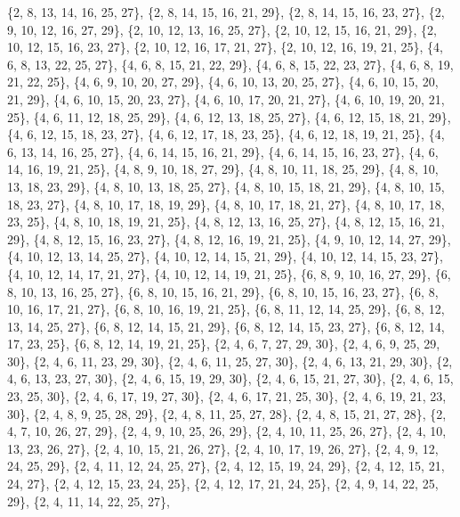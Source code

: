 \documentclass[11pt,a4paper]{article}
\begin{document}
{\{2, 8, 13, 14, 16, 25, 27\}, \{2, 8, 14, 15, 16, 21, 29\}, \{2, 8, 14, 15, 16, 23, 27\}, \{2, 9, 10, 12, 16, 27, 29\}, \{2, 10, 12, 13, 16, 25, 27\},
\{2, 10, 12, 15, 16, 21, 29\}, \{2, 10, 12, 15, 16, 23, 27\}, \{2, 10, 12, 16, 17, 21, 27\}, \{2, 10, 12, 16, 19, 21, 25\}, \{4, 6, 8, 13, 22, 25, 27\},
\{4, 6, 8, 15, 21, 22, 29\}, \{4, 6, 8, 15, 22, 23, 27\}, \{4, 6, 8, 19, 21, 22, 25\}, \{4, 6, 9, 10, 20, 27, 29\}, \{4, 6, 10, 13, 20, 25, 27\},
\{4, 6, 10, 15, 20, 21, 29\}, \{4, 6, 10, 15, 20, 23, 27\}, \{4, 6, 10, 17, 20, 21, 27\}, \{4, 6, 10, 19, 20, 21, 25\}, \{4, 6, 11, 12, 18, 25, 29\},
\{4, 6, 12, 13, 18, 25, 27\}, \{4, 6, 12, 15, 18, 21, 29\}, \{4, 6, 12, 15, 18, 23, 27\}, \{4, 6, 12, 17, 18, 23, 25\}, \{4, 6, 12, 18, 19, 21, 25\},
\{4, 6, 13, 14, 16, 25, 27\}, \{4, 6, 14, 15, 16, 21, 29\}, \{4, 6, 14, 15, 16, 23, 27\}, \{4, 6, 14, 16, 19, 21, 25\}, \{4, 8, 9, 10, 18, 27, 29\},
\{4, 8, 10, 11, 18, 25, 29\}, \{4, 8, 10, 13, 18, 23, 29\}, \{4, 8, 10, 13, 18, 25, 27\}, \{4, 8, 10, 15, 18, 21, 29\}, \{4, 8, 10, 15, 18, 23, 27\},
\{4, 8, 10, 17, 18, 19, 29\}, \{4, 8, 10, 17, 18, 21, 27\}, \{4, 8, 10, 17, 18, 23, 25\}, \{4, 8, 10, 18, 19, 21, 25\}, \{4, 8, 12, 13, 16, 25, 27\},
\{4, 8, 12, 15, 16, 21, 29\}, \{4, 8, 12, 15, 16, 23, 27\}, \{4, 8, 12, 16, 19, 21, 25\}, \{4, 9, 10, 12, 14, 27, 29\}, \{4, 10, 12, 13, 14, 25, 27\},
\{4, 10, 12, 14, 15, 21, 29\}, \{4, 10, 12, 14, 15, 23, 27\}, \{4, 10, 12, 14, 17, 21, 27\}, \{4, 10, 12, 14, 19, 21, 25\}, \{6, 8, 9, 10, 16, 27, 29\},
\{6, 8, 10, 13, 16, 25, 27\}, \{6, 8, 10, 15, 16, 21, 29\}, \{6, 8, 10, 15, 16, 23, 27\}, \{6, 8, 10, 16, 17, 21, 27\}, \{6, 8, 10, 16, 19, 21, 25\},
\{6, 8, 11, 12, 14, 25, 29\}, \{6, 8, 12, 13, 14, 25, 27\}, \{6, 8, 12, 14, 15, 21, 29\}, \{6, 8, 12, 14, 15, 23, 27\}, \{6, 8, 12, 14, 17, 23, 25\},
\{6, 8, 12, 14, 19, 21, 25\}, \{2, 4, 6, 7, 27, 29, 30\}, \{2, 4, 6, 9, 25, 29, 30\}, \{2, 4, 6, 11, 23, 29, 30\}, \{2, 4, 6, 11, 25, 27, 30\},
\{2, 4, 6, 13, 21, 29, 30\}, \{2, 4, 6, 13, 23, 27, 30\}, \{2, 4, 6, 15, 19, 29, 30\}, \{2, 4, 6, 15, 21, 27, 30\}, \{2, 4, 6, 15, 23, 25, 30\},
\{2, 4, 6, 17, 19, 27, 30\}, \{2, 4, 6, 17, 21, 25, 30\}, \{2, 4, 6, 19, 21, 23, 30\}, \{2, 4, 8, 9, 25, 28, 29\}, \{2, 4, 8, 11, 25, 27, 28\},
\{2, 4, 8, 15, 21, 27, 28\}, \{2, 4, 7, 10, 26, 27, 29\}, \{2, 4, 9, 10, 25, 26, 29\}, \{2, 4, 10, 11, 25, 26, 27\}, \{2, 4, 10, 13, 23, 26, 27\},
\{2, 4, 10, 15, 21, 26, 27\}, \{2, 4, 10, 17, 19, 26, 27\}, \{2, 4, 9, 12, 24, 25, 29\}, \{2, 4, 11, 12, 24, 25, 27\}, \{2, 4, 12, 15, 19, 24, 29\},
\{2, 4, 12, 15, 21, 24, 27\}, \{2, 4, 12, 15, 23, 24, 25\}, \{2, 4, 12, 17, 21, 24, 25\}, \{2, 4, 9, 14, 22, 25, 29\}, \{2, 4, 11, 14, 22, 25, 27\},
}
\end{document}
